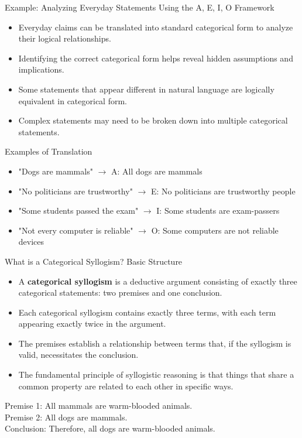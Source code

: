 \documentclass{beamer}
\begin{document}
	\begin{frame}{Example: Analyzing Everyday Statements Using the A, E, I, O Framework}
		\begin{itemize}
			\item Everyday claims can be translated into standard categorical form to analyze their logical relationships.
			\item Identifying the correct categorical form helps reveal hidden assumptions and implications.
			\item Some statements that appear different in natural language are logically equivalent in categorical form.
			\item Complex statements may need to be broken down into multiple categorical statements.
		\end{itemize}
		
		\begin{block}{Examples of Translation}
			\scriptsize
			\begin{itemize}
				\item "Dogs are mammals" $\rightarrow$ A: All dogs are mammals
				\item "No politicians are trustworthy" $\rightarrow$ E: No politicians are trustworthy people
				\item "Some students passed the exam" $\rightarrow$ I: Some students are exam-passers
				\item "Not every computer is reliable" $\rightarrow$ O: Some computers are not reliable devices
			\end{itemize}
		\end{block}
	\end{frame}
	
	\begin{frame}{What is a Categorical Syllogism? Basic Structure}
		\begin{itemize}
			\item A \textbf{categorical syllogism} is a deductive argument consisting of exactly three categorical statements: two premises and one conclusion.
			\item Each categorical syllogism contains exactly three terms, with each term appearing exactly twice in the argument.
			\item The premises establish a relationship between terms that, if the syllogism is valid, necessitates the conclusion.
			\item The fundamental principle of syllogistic reasoning is that things that share a common property are related to each other in specific ways.
		\end{itemize}
		
		\begin{example}
			Premise 1: All mammals are warm-blooded animals.\\
			Premise 2: All dogs are mammals.\\
			Conclusion: Therefore, all dogs are warm-blooded animals.
		\end{example}
	\end{frame}
	
\end{document}
